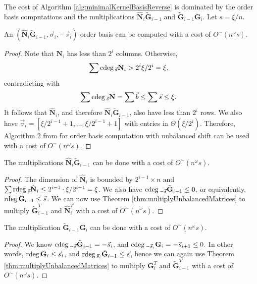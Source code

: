 The cost of Algorithm \ref{alg:minimalKernelBasisReverse} is dominated
by the order basis computations and the multiplications $\hat{\mathbf{N}}_{i}\tilde{\mathbf{G}}_{i-1}$
and $\tilde{\mathbf{G}}_{i-1}\mathbf{G}_{i}$. Let $s=\xi/n$.
\begin{lem}
An $\left(\hat{\mathbf{N}}_{i}\tilde{\mathbf{G}}_{i-1},\vec{\sigma}_{i},-\vec{s}_{i}\right)$
order basis can be computed with a cost of $O^{\sim}\left(n^{\omega}s\right)$. \end{lem}
\begin{proof}
Note that $\mathbf{N}_{i}$ has less than $2^{i}$ columns. Otherwise,
\[
\sum{\rm cdeg}\,_{\vec{s}}\mathbf{N}_{i}>2^{i}\xi/2^{i}=\xi,
\]
contradicting with 
\[
\sum{\rm cdeg}\,_{\vec{s}}\mathbf{N}=\sum\vec{b}\le\sum\vec{s}\le\xi.
\]
It follows that $\hat{\mathbf{N}}_{i}$, and therefore $\hat{\mathbf{N}}_{i}\tilde{\mathbf{G}}_{i-1}$,
also have less than $2^{i}$ rows. We also have $\vec{\sigma}_{i}=\left[\xi/2^{i-1}+1,\dots,\xi/2^{i-1}+1\right]$
with entries in $\Theta\left(\xi/2^{i}\right)$. Therefore, Algorithm
2 from \cite{za2009} for order basis computation with unbalanced
shift can be used with a cost of $O^{\sim}\left(n^{\omega}s\right)$. \end{proof}
\begin{lem}
The multiplications $\hat{\mathbf{N}}_{i}\tilde{\mathbf{G}}_{i-1}$
can be done with a cost of $O^{\sim}\left(n^{\omega}s\right)$.\end{lem}
\begin{proof}
The dimension of $\hat{\mathbf{N}}_{i}$ is bounded by $2^{i-1}\times n$
and $\sum{\rm rdeg}\,_{\vec{s}}\hat{\mathbf{N}}_{i}\le2^{i-1}\cdot\xi/2^{i-1}=\xi$.
We also have ${\rm cdeg}\,_{-\vec{s}}\tilde{\mathbf{G}}_{i-1}\le0$, or equivalently,
${\rm rdeg}\,\tilde{\mathbf{G}}_{i-1}\le\vec{s}$. We can now use Theorem
\ref{thm:multiplyUnbalancedMatrices} to multiply $\tilde{\mathbf{G}}_{i-1}^{T}$
and $\hat{\mathbf{N}}_{i}^{T}$ with a cost of $O^{\sim}\left(n^{\omega}s\right)$.\end{proof}
\begin{lem}
The multiplication $\tilde{\mathbf{G}}_{i-1}\mathbf{G}_{i}$ can be
done with a cost of $O^{\sim}\left(n^{\omega}s\right)$. \end{lem}
\begin{proof}
We know ${\rm cdeg}\,_{-\vec{s}}\tilde{\mathbf{G}}_{i-1}=-\vec{s}_{i}$,
and ${\rm cdeg}\,_{-\vec{s}_{i}}\mathbf{G}_{i}=-\vec{s}_{i+1}\le0.$ In other
words, ${\rm rdeg}\,\mathbf{G}_{i}\le\vec{s}_{i}$, and ${\rm rdeg}\,_{\vec{s}_{i}}\tilde{\mathbf{G}}_{i-1}\le\vec{s}$,
hence we can again use Theorem \ref{thm:multiplyUnbalancedMatrices}
to multiply $\mathbf{G}_{i}^{T}$ and $\tilde{\mathbf{G}}_{i-1}^{T}$
with a cost of $O^{\sim}\left(n^{\omega}s\right)$. \end{proof}
